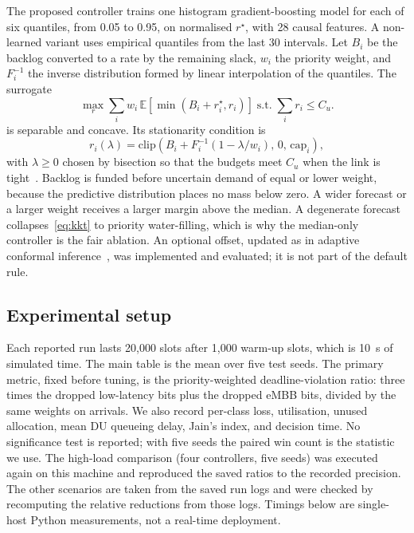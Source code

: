 \documentclass[11pt,a4paper]{article}
\begin{document}
The proposed controller trains one histogram gradient-boosting model for each of six quantiles, from 0.05 to 0.95, on normalised \(r^{\star}\), with 28 causal features. A non-learned variant uses empirical quantiles from the last 30 intervals. Let \(B_i\) be the backlog converted to a rate by the remaining slack, \(w_i\) the priority weight, and \(F_i^{-1}\) the inverse distribution formed by linear interpolation of the quantiles. The surrogate
\begin{equation}
\max_{r}\sum_i w_i\,\mathbb{E}[\min(B_i+r_i^{\star},r_i)]
\;\text{s.t.}\;
\sum_i r_i\le C_u .
\end{equation}
is separable and concave. Its stationarity condition is
\begin{equation}
r_i(\lambda)=\mathrm{clip}\!\left(B_i+F_i^{-1}(1-\lambda/w_i),\,0,\,\mathrm{cap}_i\right),
\label{eq:kkt}
\end{equation}
with \(\lambda\ge 0\) chosen by bisection so that the budgets meet \(C_u\) when the link is tight~\cite{hadley1963}. Backlog is funded before uncertain demand of equal or lower weight, because the predictive distribution places no mass below zero. A wider forecast or a larger weight receives a larger margin above the median. A degenerate forecast collapses~\eqref{eq:kkt} to priority water-filling, which is why the median-only controller is the fair ablation. An optional offset, updated as in adaptive conformal inference~\cite{gibbs2021}, was implemented and evaluated; it is not part of the default rule.

\subsection{Experimental setup}

Each reported run lasts 20{,}000 slots after 1{,}000 warm-up slots, which is 10~s of simulated time. The main table is the mean over five test seeds. The primary metric, fixed before tuning, is the priority-weighted deadline-violation ratio: three times the dropped low-latency bits plus the dropped eMBB bits, divided by the same weights on arrivals. We also record per-class loss, utilisation, unused allocation, mean DU queueing delay, Jain's index, and decision time. No significance test is reported; with five seeds the paired win count is the statistic we use. The high-load comparison (four controllers, five seeds) was executed again on this machine and reproduced the saved ratios to the recorded precision. The other scenarios are taken from the saved run logs and were checked by recomputing the relative reductions from those logs. Timings below are single-host Python measurements, not a real-time deployment.
\end{document}
